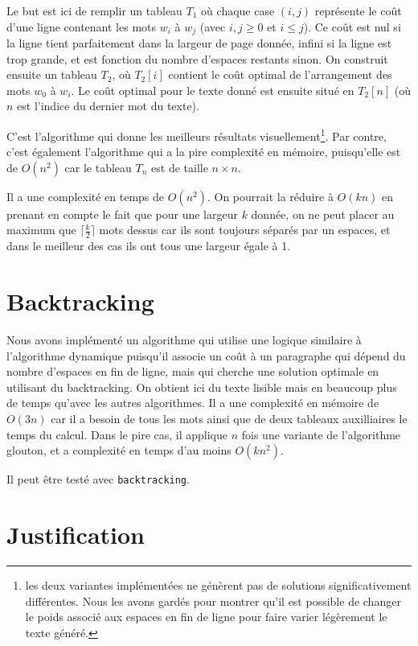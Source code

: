 \documentclass[a4paper, 11pt]{article}
\begin{document}
Le but est ici de remplir un tableau $T_1$ où chaque case $(i, j)$ représente le
coût d'une ligne contenant les mots $w_i$ à $w_j$ (avec $i,j\ge 0$ et $i\le j$).
Ce coût est nul si la ligne tient parfaitement dans la largeur de page donnée,
infini si la ligne est trop grande, et est fonction du nombre d'espaces restants
sinon. On construit ensuite un tableau $T_2$, où $T_2[i]$ contient le coût
optimal de l'arrangement des mots $w_0$ à $w_i$. Le coût optimal pour le texte
donné est ensuite situé en $T_2[n]$ (où $n$ est l'indice du dernier mot du
texte).

C'est l'algorithme qui donne les meilleurs résultats visuellement\footnote{les
deux variantes implémentées ne génèrent pas de solutions significativement
différentes. Nous les avons gardés pour montrer qu'il est possible de changer le
poids associé aux espaces en fin de ligne pour faire varier légèrement le texte
généré.}. Par contre, c'est également l'algorithme qui a la pire complexité
en mémoire, puisqu'elle est de $O(n^2)$ car le tableau $T_n$ est de taille $n
\times n$.

Il a une complexité en temps de $O(n^2)$. On pourrait la réduire à $O(kn)$
en prenant en compte le fait que pour une largeur $k$ donnée, on ne peut
placer au maximum que $\lceil \frac{k}{2} \rceil$ mots dessus car ils sont
toujours séparés par un espaces, et dans le meilleur des cas ils ont tous une
largeur égale à 1.

\section{Backtracking}

Nous avons implémenté un algorithme qui utilise une logique similaire à
l'algorithme dynamique puisqu'il associe un coût à un paragraphe qui dépend du
nombre d'espaces en fin de ligne, mais qui cherche une solution optimale en
utilisant du backtracking. On obtient ici du texte lisible mais en beaucoup plus
de temps qu'avec les autres algorithmes. Il a une complexité en mémoire de
$O(3n)$ car il a besoin de tous les mots ainsi que de deux tableaux auxilliaires
le temps du calcul. Dans le pire cas, il applique $n$ fois une variante de
l'algorithme glouton, et a complexité en temps d'au moins $O(kn^2)$.

Il peut être testé avec \verb|backtracking|.

\section{Justification}
\label{sec:justification}
\end{document}
